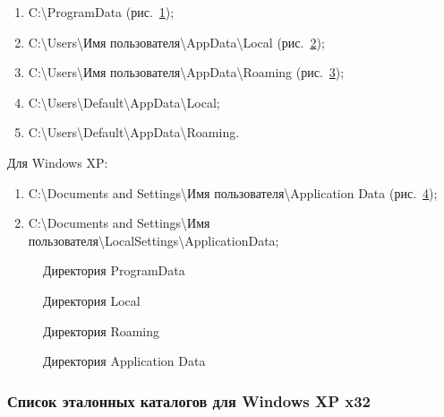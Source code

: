 \begin{enumerate}
  \item C:\textbackslash ProgramData (рис.~\ref{kucher_5:kucher_5});
  \item C:\textbackslash Users\textbackslash Имя пользователя\textbackslash AppData\textbackslash Local (рис.~\ref{kucher_6:kucher_6});
  \item C:\textbackslash Users\textbackslash Имя пользователя\textbackslash AppData\textbackslash Roaming (рис.~\ref{kucher_7:kucher_7});
  \item C:\textbackslash Users\textbackslash Default\textbackslash AppData\textbackslash Local;
  \item C:\textbackslash Users\textbackslash Default\textbackslash AppData\textbackslash Roaming.
\end{enumerate}

Для Windows XP:

\begin{enumerate}
  \item C:\textbackslash Documents and Settings\textbackslash Имя пользователя\textbackslash Application Data (рис.~\ref{kucher_8:kucher_8});
  \item C:\textbackslash Documents and Settings\textbackslash Имя пользователя\textbackslash LocalSettings\textbackslash ApplicationData;
\end{enumerate}

\begin{figure}[h!]
\caption{Директория ProgramData}
\label{kucher_5:kucher_5}
\end{figure} 

\begin{figure}[h!]
\caption{Директория Local}
\label{kucher_6:kucher_6}
\end{figure} 

\begin{figure}[h!]
\caption{Директория Roaming}
\label{kucher_7:kucher_7}
\end{figure} 

\begin{figure}[h!]
\caption{Директория Application Data}
\label{kucher_8:kucher_8}
\end{figure} 

\clearpage
\subsubsection{Список эталонных каталогов для Windows XP x32}


